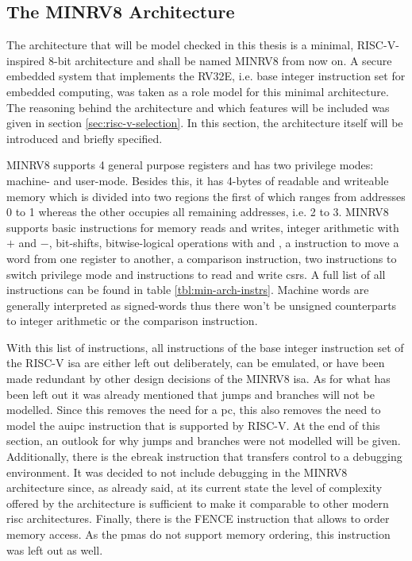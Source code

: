 \subsection{The MINRV8 Architecture}
\label{sec:minrv8}

The architecture that will be model checked in this thesis is a minimal, RISC-V-inspired 8-bit architecture and shall be named MINRV8 from now on.
A secure embedded system that implements the RV32E, i.e. base integer instruction set for embedded computing, was taken as a role model for this minimal architecture.
The reasoning behind the architecture and which features will be included was given in section \ref{sec:risc-v-selection}.
In this section, the architecture itself will be introduced and briefly specified.

MINRV8 supports 4 general purpose registers and has two privilege modes: machine- and user-mode.
Besides this, it has 4-bytes of readable and writeable memory which is divided into two regions the first of which ranges from addresses 0 to 1 whereas the other occupies all remaining addresses, i.e. 2 to 3.
MINRV8 supports basic instructions for memory reads and writes, integer arithmetic with $ + $ and $ - $, bit-shifts, bitwise-logical operations with  and , a  instruction to move a word from one register to another, a comparison instruction, two instructions to switch privilege mode and instructions to read and write \glspl{csr}.
A full list of all instructions can be found in table \ref{tbl:min-arch-instrs}.
Machine words are generally interpreted as signed-words thus there won't be unsigned counterparts to integer arithmetic or the comparison instruction.

With this list of instructions, all instructions of the base integer instruction set of the RISC-V \gls{isa} are either left out deliberately, can be emulated, or have been made redundant by other design decisions of the MINRV8 \gls{isa}.
As for what has been left out it was already mentioned that jumps and branches will not be modelled.
Since this removes the need for a \gls{pc}, this also removes the need to model the \gls{auipc} instruction that is supported by RISC-V.
At the end of this section, an outlook for why jumps and branches were not modelled will be given.
Additionally, there is the \gls{ebreak} instruction that transfers control to a debugging environment.
It was decided to not include debugging in the MINRV8 architecture since, as already said, at its current state the level of complexity offered by the architecture is sufficient to make it comparable to other modern \gls{risc} architectures.
Finally, there is the FENCE instruction that allows to order memory access.
As the \glspl{pma} do not support memory ordering, this instruction was left out as well.

